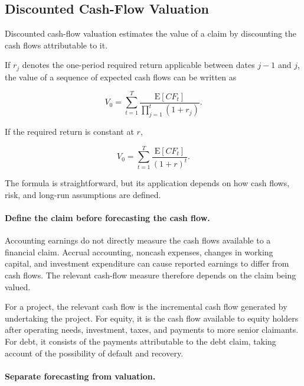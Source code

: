 \subsection{Discounted Cash-Flow Valuation}

Discounted cash-flow valuation estimates the value of a claim by discounting the cash flows attributable to it.

If $r_j$ denotes the one-period required return applicable between dates $j-1$ and $j$, the value of a sequence of expected cash flows can be written as

\begin{equation}
V_0 = \sum_{t=1}^{T}
\frac{\mathrm{E}[CF_t]}
{\prod_{j=1}^{t}(1+r_j)}.
\label{eq:ch5-general-dcf}
\end{equation}

If the required return is constant at $r$,

\begin{equation}
V_0=\sum_{t=1}^{T}
\frac{\mathrm{E}[CF_t]}{(1+r)^t}.
\label{eq:ch5-constant-dcf}
\end{equation}

The formula is straightforward, but its application depends on how cash flows, risk, and long-run assumptions are defined.

\paragraph{Define the claim before forecasting the cash flow.}

Accounting earnings do not directly measure the cash flows available to a financial claim. Accrual accounting, noncash expenses, changes in working capital, and investment expenditure can cause reported earnings to differ from cash flows. The relevant cash-flow measure therefore depends on the claim being valued.

For a project, the relevant cash flow is the incremental
cash flow generated by undertaking the project. For
equity, it is the cash flow available to equity holders
after operating needs, investment, taxes, and payments
to more senior claimants. For debt, it consists of the
payments attributable to the debt claim, taking account
of the possibility of default and recovery.

\paragraph{Separate forecasting from valuation.}

